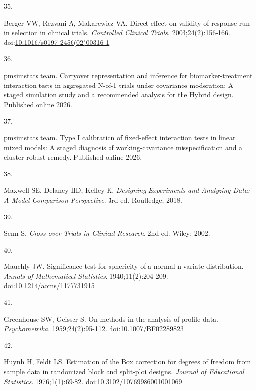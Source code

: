 \documentclass[
  11pt,
]{article}
\newlength{\cslhangindent}
\newlength{\csllabelwidth}
\newenvironment{CSLReferences}[2] %
 {\begin{list}{}{%
  \setlength{\itemindent}{0pt}
  \setlength{\leftmargin}{0pt}
  \setlength{\parsep}{0pt}
  \ifodd #1
   \setlength{\leftmargin}{\cslhangindent}
   \setlength{\itemindent}{-1\cslhangindent}
  \fi
  \setlength{\itemsep}{#2\baselineskip}}}
 {\end{list}}
\newcommand{\CSLLeftMargin}[1]{\parbox[t]{\csllabelwidth}{\strut#1\strut}}
\newcommand{\CSLRightInline}[1]{\parbox[t]{\linewidth - \csllabelwidth}{\strut#1\strut}}
\begin{document}
\begin{CSLReferences}{0}{1}
\CSLLeftMargin{35. }%
\CSLRightInline{Berger VW, Rezvani A, Makarewicz VA. Direct effect on validity of response run-in selection in clinical trials. \emph{Controlled Clinical Trials}. 2003;24(2):156-166. doi:\href{https://doi.org/10.1016/s0197-2456(02)00316-1}{10.1016/s0197-2456(02)00316-1}}

\CSLLeftMargin{36. }%
\CSLRightInline{{pmsimstats team}. Carryover representation and inference for biomarker-treatment interaction tests in aggregated {N}-of-1 trials under covariance moderation: A staged simulation study and a recommended analysis for the {Hybrid} design. Published online 2026.}

\CSLLeftMargin{37. }%
\CSLRightInline{{pmsimstats team}. Type {I} calibration of fixed-effect interaction tests in linear mixed models: A staged diagnosis of working-covariance misspecification and a cluster-robust remedy. Published online 2026.}

\CSLLeftMargin{38. }%
\CSLRightInline{Maxwell SE, Delaney HD, Kelley K. \emph{Designing Experiments and Analyzing Data: A Model Comparison Perspective}. 3rd ed. Routledge; 2018.}

\CSLLeftMargin{39. }%
\CSLRightInline{Senn S. \emph{Cross-over Trials in Clinical Research}. 2nd ed. Wiley; 2002.}

\CSLLeftMargin{40. }%
\CSLRightInline{Mauchly JW. Significance test for sphericity of a normal n-variate distribution. \emph{Annals of Mathematical Statistics}. 1940;11(2):204-209. doi:\href{https://doi.org/10.1214/aoms/1177731915}{10.1214/aoms/1177731915}}

\CSLLeftMargin{41. }%
\CSLRightInline{Greenhouse SW, Geisser S. On methods in the analysis of profile data. \emph{Psychometrika}. 1959;24(2):95-112. doi:\href{https://doi.org/10.1007/BF02289823}{10.1007/BF02289823}}

\CSLLeftMargin{42. }%
\CSLRightInline{Huynh H, Feldt LS. Estimation of the {Box} correction for degrees of freedom from sample data in randomized block and split-plot designs. \emph{Journal of Educational Statistics}. 1976;1(1):69-82. doi:\href{https://doi.org/10.3102/10769986001001069}{10.3102/10769986001001069}}


\end{CSLReferences}
\end{document}
